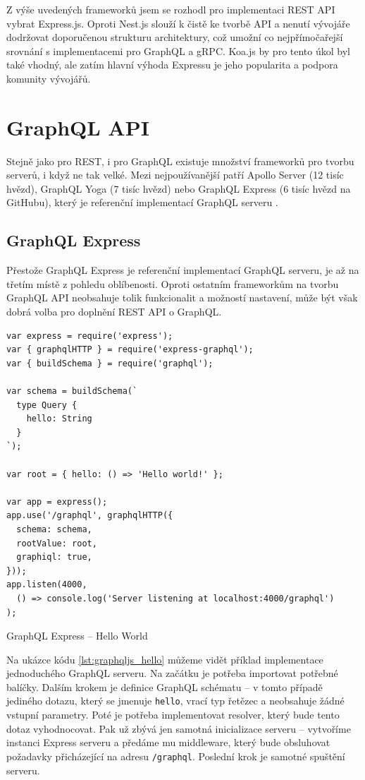 \documentclass[thesis=M,czech]{FITthesis}[2019/12/23]
\begin{document}
Z výše uvedených frameworků jsem se rozhodl pro implementaci REST API vybrat Express.js. Oproti Nest.js slouží k čistě ke tvorbě API a nenutí vývojáře  dodržovat doporučenou strukturu architektury, což umožní co nejpřímočařejší srovnání s implementacemi pro GraphQL a gRPC. Koa.js by pro tento úkol byl také vhodný, ale zatím hlavní výhoda Expressu je jeho popularita a podpora komunity vývojářů.

\section{GraphQL API}
Stejně jako pro REST, i pro GraphQL existuje množství frameworků pro tvorbu serverů, i když ne tak velké. Mezi nejpoužívanější patří Apollo Server (12 tisíc hvězd), GraphQL Yoga (7 tisíc hvězd) nebo GraphQL Express (6 tisíc hvězd na GitHubu), který je referenční implementací GraphQL serveru \cite{graphql_libraries}.

\subsection*{GraphQL Express}
Přestože GraphQL Express je referenční implementací GraphQL serveru, je až na třetím místě z pohledu oblíbenosti. Oproti ostatním frameworkům na tvorbu GraphQL API neobsahuje tolik funkcionalit a možností nastavení, může být však dobrá volba pro doplnění REST API o GraphQL.

\begin{listing}[H]
\begin{verbatim}
var express = require('express');
var { graphqlHTTP } = require('express-graphql');
var { buildSchema } = require('graphql');

var schema = buildSchema(`
  type Query {
    hello: String
  }
`);

var root = { hello: () => 'Hello world!' };

var app = express();
app.use('/graphql', graphqlHTTP({
  schema: schema,
  rootValue: root,
  graphiql: true,
}));
app.listen(4000, 
  () => console.log('Server listening at localhost:4000/graphql')
);
\end{verbatim}
\caption{GraphQL Express -- Hello World}
\label{lst:graphqljs_hello}
\end{listing}

Na ukázce kódu \ref{lst:graphqljs_hello} můžeme vidět příklad implementace jednoduchého GraphQL serveru. Na začátku je potřeba importovat potřebné balíčky. Dalším krokem je definice GraphQL schématu -- v tomto případě jediného dotazu, který se jmenuje \texttt{hello}, vrací typ řetězec a neobsahuje žádné vstupní parametry. Poté je potřeba implementovat resolver, který bude tento dotaz vyhodnocovat. Pak už zbývá jen samotná inicializace serveru -- vytvoříme instanci Express serveru a předáme mu middleware, který bude obsluhovat požadavky přicházející na adresu \texttt{/graphql}. Poslední krok je samotné spuštění serveru.
\end{document}
